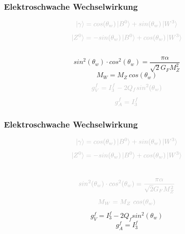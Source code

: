 \begin{frame}
	\frametitle{Elektroschwache Wechselwirkung}
	\begin{center}
		\begin{equation*}
		\textcolor{lightgray}{\ket{\gamma} =  cos(\theta_w)\ket{B^0} + sin(\theta_w) \ket{W^3}}
		\end{equation*}
		\begin{equation*}
		\textcolor{lightgray}{\ket{Z^0} = -sin(\theta_w) \ket{B^0} + cos(\theta_w) \ket{W^3}}
		\end{equation*}
		\\
		\begin{equation*}
		sin^2(\theta_w)\cdot cos^2(\theta_w) = \frac{\pi\alpha}{\sqrt{2}G_FM_Z^2}
		\end{equation*}
		\begin{equation*}
		M_W = M_Z~cos(\theta_w)
		\end{equation*}
		\begin{equation*}
			\textcolor{lightgray}{g_V^f = I^f_3-2 Q_f sin^2(\theta_w)}
		\end{equation*}
		\begin{equation*}
			\textcolor{lightgray}{g_A^f = I^f_3}
		\end{equation*}
	\end{center}
\end{frame}

\begin{frame}
	\frametitle{Elektroschwache Wechselwirkung}
	\begin{center}
		\begin{equation*}
		\textcolor{lightgray}{\ket{\gamma} =  cos(\theta_w)\ket{B^0} + sin(\theta_w) \ket{W^3}}
		\end{equation*}
		\begin{equation*}
		\textcolor{lightgray}{\ket{Z^0} = -sin(\theta_w) \ket{B^0} + cos(\theta_w) \ket{W^3}}
		\end{equation*}
		\\
		\begin{equation*}
		\textcolor{lightgray}{sin^2(\theta_w)\cdot cos^2(\theta_w) = \frac{\pi\alpha}{\sqrt{2}G_FM_Z^2}}
		\end{equation*}
		\begin{equation*}
		\textcolor{lightgray}{M_W = M_Z~cos(\theta_w)}
		\end{equation*}
		\begin{equation*}
		g_V^f = I^f_3-2 Q_f sin^2(\theta_w)
		\end{equation*}
		\begin{equation*}
		g_A^f = I^f_3
		\end{equation*}
	\end{center}
\end{frame}

